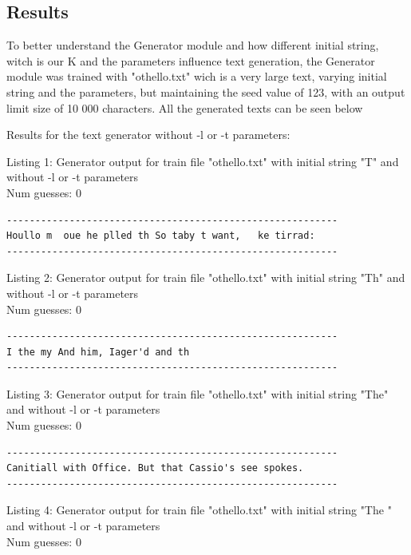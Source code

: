 \documentclass{article}
\begin{document}
\subsection{Results}

To better understand the Generator module and how different initial string, witch is our K and the parameters influence
text generation, the Generator module was trained with "othello.txt" wich is a very large text, varying initial string and the parameters, but
maintaining the seed value of 123, with an output limit size of 10 000 characters.
All the generated texts can be seen below

Results for the text generator without -l or -t parameters:

\hfill

Listing 1: Generator output for train file "othello.txt" with initial string "T" and without -l or -t parameters
\\Num guesses: 0

\begin{lstlisting}
----------------------------------------------------------
Houllo m  oue he plled th So taby t want,   ke tirrad:
----------------------------------------------------------
\end{lstlisting}

Listing 2: Generator output for train file "othello.txt" with initial string "Th" and without -l or -t parameters
\\Num guesses: 0

\begin{lstlisting}
----------------------------------------------------------
I the my And him, Iager'd and th
----------------------------------------------------------
\end{lstlisting}

Listing 3: Generator output for train file "othello.txt" with initial string "The" and without -l or -t parameters
\\Num guesses: 0

\begin{lstlisting}
----------------------------------------------------------
Canitiall with Office. But that Cassio's see spokes.
----------------------------------------------------------
\end{lstlisting}

Listing 4: Generator output for train file "othello.txt" with initial string "The " and without -l or -t parameters
\\Num guesses: 0
\end{document}
